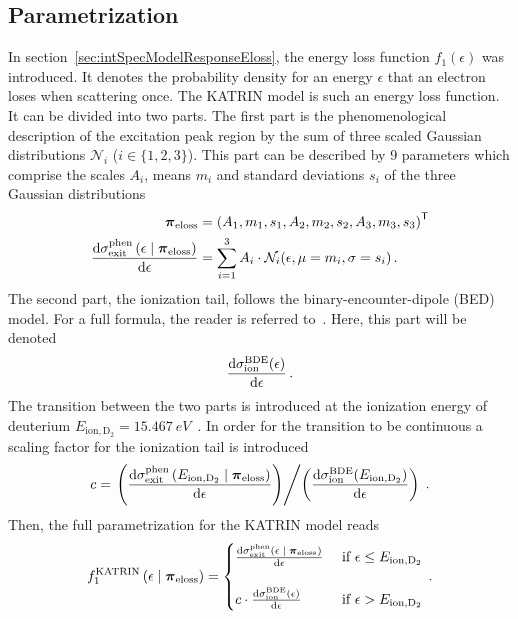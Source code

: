 \subsection{Parametrization}
In section~\ref{sec:intSpecModelResponseEloss}, the energy loss function $f_1(\epsilon)$ was introduced. It denotes the probability density for an energy $\epsilon$ that an electron loses when scattering once. The KATRIN model is such an energy loss function. It can be divided into two parts. The first part is the phenomenological description of the excitation peak region by the sum of three scaled Gaussian distributions $\mathcal{N}_i$ ($i \in \{1,2,3\}$). This part can be described by 9 parameters which comprise the scales $A_i$, means $m_i$ and standard deviations $s_i$ of the three Gaussian distributions~\cite{Hannen2019_2}
\newcommand{\katrinElossPhen}[1]{
	\frac{
		\d\sigma_\mathrm{exit}^\mathrm{phen}\giventhat*{#1}{\nuisanceParamVec_\mathrm{eloss}}
	}{
		\d \epsilon
	}
}
\begin{align}
\label{eq:katrinElossElossModelParams}
\nuisanceParamVec_\mathrm{eloss} &= 
\transp{\left(
	A_1, m_1, s_1, 
	A_2, m_2, s_2, 
	A_3, m_3, s_3
	\right)} \\
\katrinElossPhen{\epsilon} &=
\sum_{i=1}^3 A_i \cdot \mathcal{N}_i(\epsilon, \mu=m_i, \sigma=s_i)
\fullstop
\end{align}
The second part, the ionization tail, follows the binary-encounter-dipole (BED) model. For a full formula, the reader is referred to~\cite{Kim1994}. Here, this part will be denoted
\newcommand{\katrinElossBDE}[1]{
	\frac{
		\d \sigma_\mathrm{ion}^\mathrm{BDE}(#1)
	}{
		\d \epsilon
	}
}
\begin{equation}
	\katrinElossBDE{\epsilon}
	\fullstop
\end{equation}%
\newcommand{\ionEnergyDeu}{E_\mathrm{ion,D_2}}%
The transition between the two parts is introduced at the ionization energy of deuterium $\ionEnergyDeu=\SI{15.467}{eV}$~\cite{Shiner1993}. In order for the transition to be continuous a scaling factor for the ionization tail is introduced
\begin{equation}
c = \left.	
	\left(
		\katrinElossPhen{\ionEnergyDeu}
	\right)
\middle/
	\left(
		\katrinElossBDE{\ionEnergyDeu}
	\right)
\right.
\fullstop
\end{equation}
Then, the full parametrization for the KATRIN model reads~\cite{Hannen2019_1}
\begin{equation}
	f_1^\mathrm{KATRIN}
	\giventhat*{\epsilon}{\nuisanceParamVec_\mathrm{eloss}} = 
	\begin{cases}
	\katrinElossPhen{\epsilon}
	&\text{ if } \epsilon \leq E_\mathrm{ion,D_2} \\
	\vphantom{.} & \\
	c \cdot \katrinElossBDE{\epsilon} 
	&\text{ if } \epsilon > E_\mathrm{ion,D_2}
	\end{cases}
	\fullstop
\end{equation}

